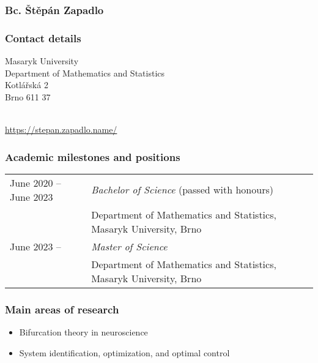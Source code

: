 \subsubsection*{Bc. Štěpán Zapadlo}
\label{cv:szapadlo}
\vspace{-0.5\baselineskip}
\subsubsection*{Contact details}

Masaryk University\\
Department of Mathematics and Statistics\\
Kotlářská 2\\
Brno 611 37

\\
\url{https://stepan.zapadlo.name/}\\

\vspace{-0.5\baselineskip}
\subsubsection*{Academic milestones and positions}

\enlargethispage{1cm}
\begin{tabularx}{\linewidth}{ll}
    June 2020 -- June 2023 & \emph{Bachelor of Science} {\small (passed with honours)} \\
    & Department of Mathematics and Statistics, Masaryk University, Brno \\
    June 2023 --  & \emph{Master of Science} \\
    & Department of Mathematics and Statistics, Masaryk University, Brno
\end{tabularx}

\vspace{-\baselineskip}
\subsubsection*{Main areas of research}

\begin{itemize}
    \item{Bifurcation theory in neuroscience}
    \item{System identification, optimization, and optimal control}
\end{itemize}

\vspace{-0.75\baselineskip}

